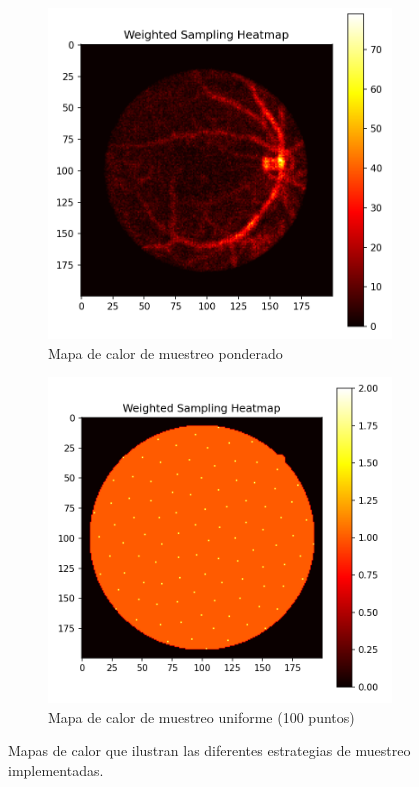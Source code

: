 \begin{figure}[tbp]
\begin{subfigure}[b]{0.3\textwidth}
        \includegraphics[width=\textwidth]{imaxes/muestraje/weighted_sampling_heatmap.png}
        \caption{Mapa de calor de muestreo ponderado}
        \label{fig:weighted_sampling_heatmap}
    \end{subfigure}
    \hfill
    \begin{subfigure}[b]{0.3\textwidth}
        \centering
        \includegraphics[width=\textwidth]{imaxes/muestraje/uniform_sampling_heatmap.png}
        \caption{Mapa de calor de muestreo uniforme (100 puntos)}
        \label{fig:uniform_sampling_heatmap}
    \end{subfigure}
    \caption{Mapas de calor que ilustran las diferentes estrategias de muestreo implementadas.}
    \label{fig:sampling_heatmaps}
\end{figure}

